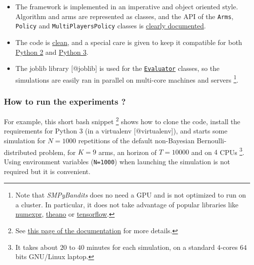\begin{itemize}
\tightlist
\item
  The framework is implemented in an imperative and object oriented
  style. Algorithm and arms are represented as classes, and the API of
  the \texttt{Arms}, \texttt{Policy} and \texttt{MultiPlayersPolicy}
  classes is \href{https://smpybandits.github.io/API.html}{clearly
  documented}.
\item
  The code is
  \href{https://smpybandits.github.io/logs/main_pylint_log.txt}{clean},
  and a special care is given to keep it compatible for both
  \href{https://smpybandits.github.io/logs/main_pylint_log.txt}{Python
  2} and
  \href{https://smpybandits.github.io/logs/main_pylint3_log.txt}{Python
  3}.
\item
  The joblib library {[}@joblib{]} is used for the
  \href{https://smpybandits.github.io/docs/Environment.Evaluator.html}{\texttt{Evaluator}}
  classes, so the simulations are easily ran in parallel on multi-core
  machines and servers \footnote{Note that \emph{SMPyBandits} does no
    need a GPU and is not optimized to run on a cluster. In particular,
    it does not take advantage of popular libraries like
    \href{https://github.com/pydata/numexpr}{numexpr},
    \href{http://www.deeplearning.net/software/theano/}{theano} or
    \href{https://www.tensorflow.org/}{tensorflow}.}.
\end{itemize}

\hypertarget{how-to-run-the-experiments}{%
\subsubsection{How to run the experiments
?}\label{how-to-run-the-experiments}}

For example, this short bash snippet \footnote{See
  \href{https://smpybandits.github.io/How_to_run_the_code.html}{this
  page of the documentation} for more details.} shows how to clone the
code, install the requirements for Python 3 (in a virtualenv
{[}@virtualenv{]}), and starts some simulation for \(N=1000\)
repetitions of the default non-Bayesian Bernoulli-distributed problem,
for \(K=9\) arms, an horizon of \(T=10000\) and on \(4\) CPUs \footnote{It
  takes about \(20\) to \(40\) minutes for each simulation, on a
  standard \(4\)-cores \(64\) bits GNU/Linux laptop.}. Using environment
variables (\texttt{N=1000}) when launching the simulation is not
required but it is convenient.

